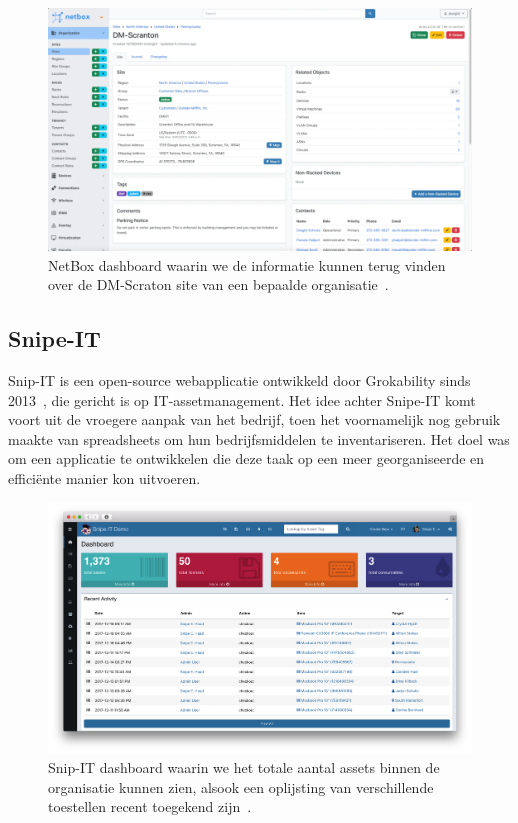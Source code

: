 \begin{figure}[h!]
    \includegraphics[width=\textwidth]
    {./graphics/netbox-dashboard.png}
    \caption{\label{fig:netbox-dashboard}NetBox dashboard waarin we de informatie kunnen terug vinden over de DM-Scraton site van een bepaalde organisatie~\autocite{netbox-dashboard}.}
\end{figure}

\subsection{Snipe-IT}
\label{sub:snipe-it}

Snip-IT is een open-source webapplicatie ontwikkeld door Grokability sinds 2013~\autocite{snipe-it-introduction}, die gericht is op IT-assetmanagement.
Het idee achter Snipe-IT komt voort uit de vroegere aanpak van het bedrijf, toen het voornamelijk nog gebruik maakte van spreadsheets om hun bedrijfsmiddelen te inventariseren.
Het doel was om een applicatie te ontwikkelen die deze taak op een meer georganiseerde en effici\"ente manier kon uitvoeren.

\begin{figure}[h!]
    \includegraphics[width=\textwidth]
    {./graphics/snipe-dashboard.png}
    \caption{\label{fig:snipe-it-dashboard}Snip-IT dashboard waarin we het totale aantal assets binnen de organisatie kunnen zien, alsook een oplijsting van verschillende toestellen recent toegekend zijn~\autocite{snipe-it-dashboard}.}
\end{figure}

